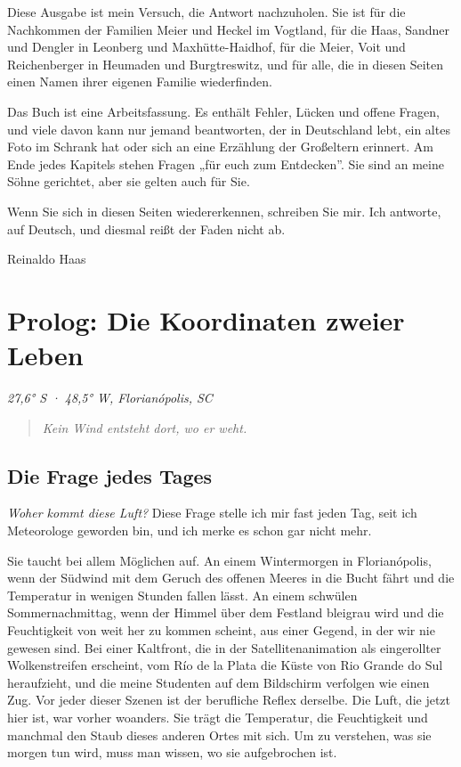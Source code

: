 \documentclass[
  ngerman,
  11pt,
  openany]{book}
\begin{document}
Diese Ausgabe ist mein Versuch, die Antwort nachzuholen. Sie ist für die
Nachkommen der Familien Meier und Heckel im Vogtland, für die Haas,
Sandner und Dengler in Leonberg und Maxhütte-Haidhof, für die Meier,
Voit und Reichenberger in Heumaden und Burgtreswitz, und für alle, die
in diesen Seiten einen Namen ihrer eigenen Familie wiederfinden.

Das Buch ist eine Arbeitsfassung. Es enthält Fehler, Lücken und offene
Fragen, und viele davon kann nur jemand beantworten, der in Deutschland
lebt, ein altes Foto im Schrank hat oder sich an eine Erzählung der
Großeltern erinnert. Am Ende jedes Kapitels stehen Fragen „für euch zum
Entdecken''. Sie sind an meine Söhne gerichtet, aber sie gelten auch für
Sie.

Wenn Sie sich in diesen Seiten wiedererkennen, schreiben Sie mir. Ich
antworte, auf Deutsch, und diesmal reißt der Faden nicht ab.

Reinaldo Haas

\chapter*{Prolog: Die Koordinaten zweier Leben}\label{prologo}

\emph{27,6° S · 48,5° W, Florianópolis, SC}

\begin{quote}
\emph{Kein Wind entsteht dort, wo er weht.}
\end{quote}

\section{Die Frage jedes Tages}\label{die-frage-jedes-tages}

\emph{Woher kommt diese Luft?} Diese Frage stelle ich mir fast jeden
Tag, seit ich Meteorologe geworden bin, und ich merke es schon gar nicht
mehr.

Sie taucht bei allem Möglichen auf. An einem Wintermorgen in
Florianópolis, wenn der Südwind mit dem Geruch des offenen Meeres in die
Bucht fährt und die Temperatur in wenigen Stunden fallen lässt. An einem
schwülen Sommernachmittag, wenn der Himmel über dem Festland bleigrau
wird und die Feuchtigkeit von weit her zu kommen scheint, aus einer
Gegend, in der wir nie gewesen sind. Bei einer Kaltfront, die in der
Satellitenanimation als eingerollter Wolkenstreifen erscheint, vom Río
de la Plata die Küste von Rio Grande do Sul heraufzieht, und die meine
Studenten auf dem Bildschirm verfolgen wie einen Zug. Vor jeder dieser
Szenen ist der berufliche Reflex derselbe. Die Luft, die jetzt hier ist,
war vorher woanders. Sie trägt die Temperatur, die Feuchtigkeit und
manchmal den Staub dieses anderen Ortes mit sich. Um zu verstehen, was
sie morgen tun wird, muss man wissen, wo sie aufgebrochen ist.
\end{document}
